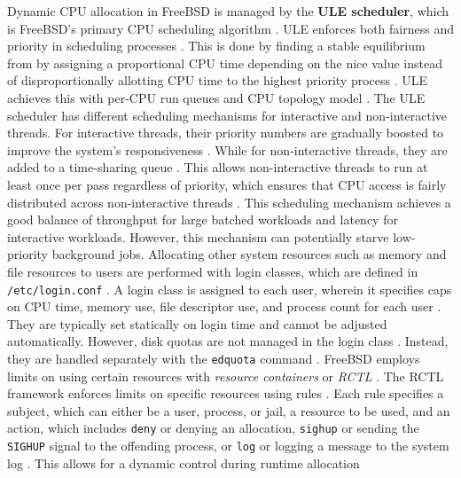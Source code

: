 Dynamic CPU allocation in FreeBSD is managed by the \textbf{ULE scheduler}, which is FreeBSD's primary CPU scheduling algorithm
\parencite{mckusick2014_process}. ULE enforces both fairness and priority in scheduling processes \parencite{mckusick2014_process}.
This is done by finding a stable equilibrium from by assigning a proportional CPU time depending on the nice value instead
of disproportionally allotting CPU time to the highest priority process \parencite{roberson_ule}.
ULE achieves this with per-CPU run queues and CPU topology model \parencite{roberson_ule}.
The ULE scheduler has different scheduling mechanisms for interactive and non-interactive threads. For interactive threads,
their priority numbers are gradually boosted to improve the system's responsiveness \parencite{mckusick2014_process}. While
for non-interactive threads, they are added to a time-sharing queue \parencite{mckusick2014_process}. This allows non-interactive
threads to run at least once per pass regardless of priority, which ensures that CPU access is fairly distributed across
non-interactive threads \parencite{mckusick2014_process}. This scheduling mechanism achieves a good balance of throughput
for large batched workloads and latency for interactive workloads. However, this mechanism can potentially starve low-priority
background jobs. Allocating other system resources such as memory and file resources to users are performed with login classes,
which are defined in \texttt{/etc/login.conf} \parencite{freebsd_limiting_users}. A login class is assigned to each user,
wherein it specifies caps on CPU time, memory use, file descriptor use, and process count for each user \parencite{freebsd_limiting_users}.
They are typically set statically on login time and cannot be adjusted automatically.
However, disk quotas are not managed in the login class \parencite{freebsd_limiting_users}. Instead, they are handled separately
with the \texttt{edquota} command \parencites{freebsd_limiting_users}{freebsd_filesys_quotas}.
FreeBSD employs limits on using certain resources with \textit{resource containers} or \textit{RCTL} \parencite{freebsd_resource_limits}.
The RCTL framework enforces limits on specific resources using rules \parencite{freebsd_resource_limits}. Each rule specifies
a subject, which can either be a user, process, or jail, a resource to be used, and an action, which includes \texttt{deny}
or denying an allocation, \texttt{sighup} or sending the \texttt{SIGHUP} signal to the offending process, or \texttt{log}
or logging a message to the system log \parencite{freebsd_resource_limits}. This allows for a dynamic control during runtime allocation
